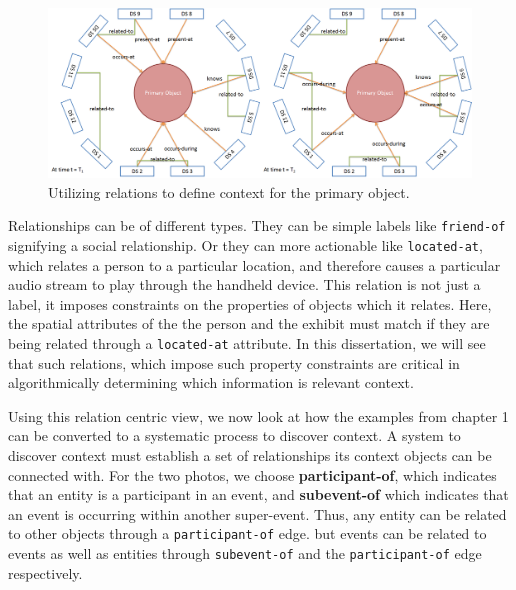 \begin{figure}[t]
\centering
\includegraphics[width=\textwidth]{media/chapter2/cn.png}
\caption{Utilizing relations to define context for the primary object.}
\label{fig:cn-def}
\end{figure}

Relationships can be of different types. They can be simple labels like \texttt{friend-of} signifying a social relationship. Or they can more actionable like \texttt{located-at}, which relates a person to a particular location, and therefore causes a particular audio stream to play through the handheld device. This relation is not just a label, it imposes constraints on the properties of objects which it relates. Here, the spatial attributes of the the person and the exhibit must match if they are being related through a \texttt{located-at} attribute. In this dissertation, we will see that such relations, which impose such property constraints are critical in algorithmically determining which information is relevant context.

Using this relation centric view, we now look at how the examples from chapter 1 can be converted to a systematic process to discover context. A system to discover context must establish a set of relationships its context objects can be connected with. For the two photos, we choose \textbf{participant-of}, which indicates that an entity is a participant in an event, and \textbf{subevent-of} which indicates that an event is occurring within another super-event. Thus, any entity can be related to other objects through a \texttt{participant-of} edge. but events can be related to events as well as entities through \texttt{subevent-of} and the \texttt{participant-of} edge respectively.

